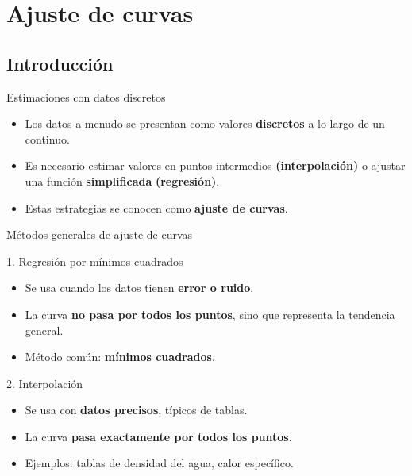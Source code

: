 \documentclass[main.tex]{subfiles}
\begin{document}
\section{Ajuste de curvas}

\subsection{Introducción}
\begin{frame}{Estimaciones con datos discretos}
\begin{itemize}
  \item Los datos a menudo se presentan como valores \textbf{discretos} a lo largo de un continuo.
  \item Es necesario estimar valores en puntos intermedios \textbf{(interpolación)} o ajustar una función \textbf{simplificada} \textbf{(regresión)}.
  \item Estas estrategias se conocen como \textbf{ajuste de curvas}.
\end{itemize}
\end{frame}

\begin{frame}{Métodos generales de ajuste de curvas}
\begin{block}{1. Regresión por mínimos cuadrados}
\begin{itemize}
  \item Se usa cuando los datos tienen \textbf{error o ruido}.
  \item La curva \textbf{no pasa por todos los puntos}, sino que representa la tendencia general.
  \item Método común: \textbf{mínimos cuadrados}.
\end{itemize}
\end{block}

\begin{block}{2. Interpolación}
\begin{itemize}
  \item Se usa con \textbf{datos precisos}, típicos de tablas.
  \item La curva \textbf{pasa exactamente por todos los puntos}.
  \item Ejemplos: tablas de densidad del agua, calor específico.
\end{itemize}
\end{block}
\end{frame}
\end{document}
